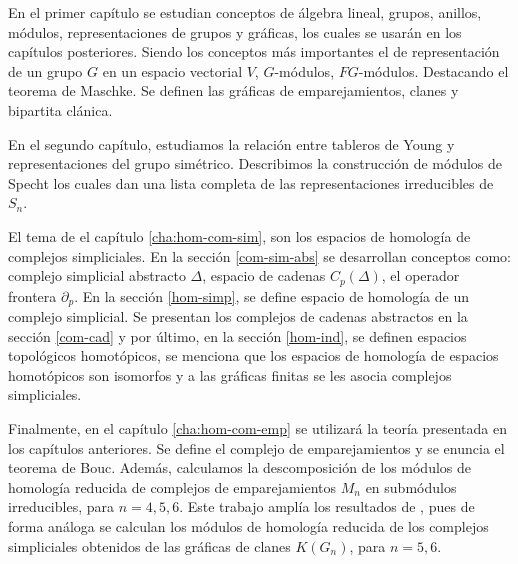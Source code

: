 \documentclass[12pt]{book}
\theoremstyle{definition}
\newcounter{in}
\newcounter{ini}
\begin{document}



En el primer capítulo se estudian conceptos de álgebra lineal, grupos,
anillos, módulos, representaciones de grupos y gráficas, los cuales se
usarán en los capítulos posteriores. Siendo los conceptos más
importantes el de representación de un grupo $G$ en un espacio
vectorial $V$, $G$-módulos, $FG$-módulos. Destacando el teorema de
Maschke. Se definen las gráficas de emparejamientos, clanes y
bipartita clánica.

En el segundo capítulo, estudiamos la relación entre tableros de Young
y representaciones del grupo simétrico. Describimos la construcción de
módulos de Specht los cuales dan una lista completa de las
representaciones irreducibles de $S_{n}$.

El tema de el capítulo \ref{cha:hom-com-sim}, son los espacios de homología de complejos simpliciales.
En la sección \ref{com-sim-abs} se desarrollan conceptos como:
complejo simplicial abstracto $\Delta$, espacio de cadenas $C_{p}(\Delta)$, el
operador frontera $\partial_{p}$. En la sección \ref{hom-simp}, se
define espacio de homología de un complejo simplicial. Se
presentan los complejos de cadenas abstractos en la sección \ref{com-cad} y por
último, en la sección \ref{hom-ind}, se definen espacios topológicos
homotópicos, se menciona que los espacios de homología de espacios homotópicos son
isomorfos y a las gráficas finitas se les asocia complejos simpliciales.

Finalmente, en el capítulo \ref{cha:hom-com-emp} se utilizará la teoría presentada en los
capítulos anteriores. Se define el complejo de emparejamientos y se
enuncia el teorema de Bouc.  Además, calculamos la descomposición de
los módulos de homología reducida de complejos de emparejamientos $M_{n}$ en
submódulos irreducibles, para $n=4,5,6$. Este trabajo amplía los resultados de \cite{robles08:_repres}, pues de
forma análoga se calculan los módulos de homología reducida de los complejos
simpliciales obtenidos de las gráficas de clanes $K(G_{n})$, para
$n=5,6$.
\end{document}
